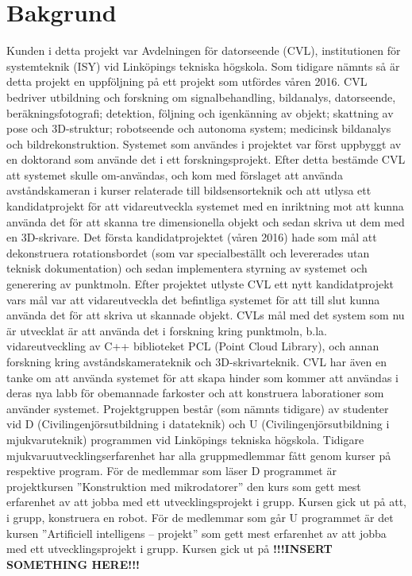 \chapter{Bakgrund}
\label{cha:background}


Kunden i detta projekt var Avdelningen för datorseende (CVL), institutionen för systemteknik (ISY) vid Linköpings tekniska högskola. Som tidigare nämnts så är detta projekt en uppföljning på ett projekt som utfördes våren 2016. 
CVL bedriver utbildning och forskning om signalbehandling, bildanalys, datorseende, beräkningsfotografi; detektion, följning och igenkänning av objekt; skattning av pose och 3D-struktur; robotseende och autonoma system; medicinsk bildanalys och bildrekonstruktion. Systemet som användes i projektet var först uppbyggt av en doktorand som använde det i ett forskningsprojekt. Efter detta bestämde CVL att systemet skulle om-användas, och kom med förslaget att använda avståndskameran i kurser relaterade till bildsensorteknik och att utlysa ett kandidatprojekt för att vidareutveckla systemet med en inriktning mot att kunna använda det för att skanna tre dimensionella objekt och sedan skriva ut dem med en 3D-skrivare. Det första kandidatprojektet (våren 2016) hade som mål att dekonstruera rotationsbordet (som var specialbeställt och levererades utan teknisk dokumentation) och sedan implementera styrning av systemet och generering av punktmoln. Efter projektet utlyste CVL ett nytt kandidatprojekt vars mål var att vidareutveckla det befintliga systemet för att till slut kunna använda det för att skriva ut skannade objekt.
 CVLs mål med det system som nu är utvecklat är att använda det i forskning kring punktmoln, b.la. vidareutveckling av C++ biblioteket PCL (Point Cloud Library), och annan forskning kring avståndskamerateknik och 3D-skrivarteknik. CVL har även en tanke om att använda systemet för att skapa hinder som kommer att användas i deras nya labb för obemannade farkoster och att konstruera laborationer som använder systemet.
Projektgruppen består (som nämnts tidigare) av studenter vid D (Civilingenjörsutbildning i datateknik) och U (Civilingenjörsutbildning i mjukvaruteknik) programmen vid Linköpings tekniska högskola. Tidigare mjukvaruutvecklingserfarenhet har alla gruppmedlemmar fått genom kurser på respektive program. För de medlemmar som läser D programmet är projektkursen ”Konstruktion med mikrodatorer” den kurs som gett mest erfarenhet av att jobba med ett utvecklingsprojekt i grupp. Kursen gick ut på att, i grupp, konstruera en robot. För de medlemmar som går U programmet är det kursen ”Artificiell intelligens – projekt” som gett mest erfarenhet av att jobba med ett utvecklingsprojekt i grupp. Kursen gick ut på \textbf{!!!INSERT SOMETHING HERE!!!}   

